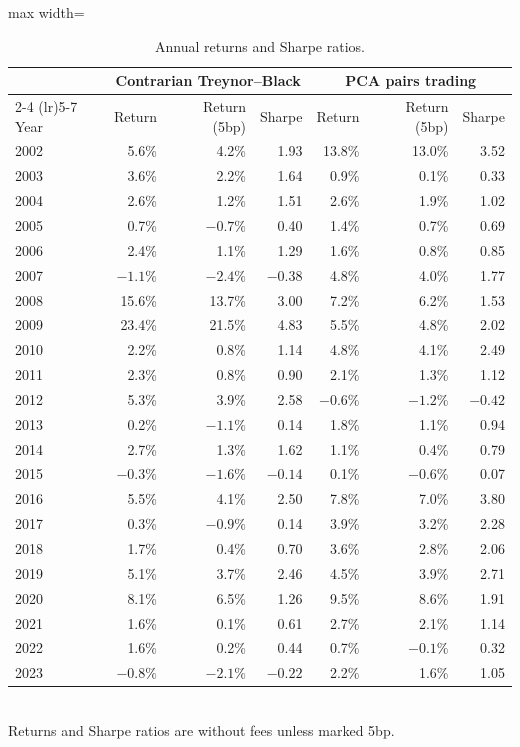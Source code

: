 \documentclass[11pt,letterpaper]{article}
\begin{document}
\begin{table}[!htbp]
\centering
\caption{Annual returns and Sharpe ratios.}
\label{tab:yearly}
\begin{adjustbox}{max width=\linewidth}
\begin{tabular}{lrrrrrr}
\toprule
& \multicolumn{3}{c}{Contrarian Treynor--Black} & \multicolumn{3}{c}{PCA pairs trading} \\
\cmidrule(lr){2-4} \cmidrule(lr){5-7}
Year & Return & Return (5bp) & Sharpe & Return & Return (5bp) & Sharpe \\
\midrule
2002 & 5.6\% & 4.2\% & 1.93 & 13.8\% & 13.0\% & 3.52 \\
2003 & 3.6\% & 2.2\% & 1.64 & 0.9\% & 0.1\% & 0.33 \\
2004 & 2.6\% & 1.2\% & 1.51 & 2.6\% & 1.9\% & 1.02 \\
2005 & 0.7\% & $-0.7\%$ & 0.40 & 1.4\% & 0.7\% & 0.69 \\
2006 & 2.4\% & 1.1\% & 1.29 & 1.6\% & 0.8\% & 0.85 \\
2007 & $-1.1\%$ & $-2.4\%$ & $-0.38$ & 4.8\% & 4.0\% & 1.77 \\
2008 & 15.6\% & 13.7\% & 3.00 & 7.2\% & 6.2\% & 1.53 \\
2009 & 23.4\% & 21.5\% & 4.83 & 5.5\% & 4.8\% & 2.02 \\
2010 & 2.2\% & 0.8\% & 1.14 & 4.8\% & 4.1\% & 2.49 \\
2011 & 2.3\% & 0.8\% & 0.90 & 2.1\% & 1.3\% & 1.12 \\
2012 & 5.3\% & 3.9\% & 2.58 & $-0.6\%$ & $-1.2\%$ & $-0.42$ \\
2013 & 0.2\% & $-1.1\%$ & 0.14 & 1.8\% & 1.1\% & 0.94 \\
2014 & 2.7\% & 1.3\% & 1.62 & 1.1\% & 0.4\% & 0.79 \\
2015 & $-0.3\%$ & $-1.6\%$ & $-0.14$ & 0.1\% & $-0.6\%$ & 0.07 \\
2016 & 5.5\% & 4.1\% & 2.50 & 7.8\% & 7.0\% & 3.80 \\
2017 & 0.3\% & $-0.9\%$ & 0.14 & 3.9\% & 3.2\% & 2.28 \\
2018 & 1.7\% & 0.4\% & 0.70 & 3.6\% & 2.8\% & 2.06 \\
2019 & 5.1\% & 3.7\% & 2.46 & 4.5\% & 3.9\% & 2.71 \\
2020 & 8.1\% & 6.5\% & 1.26 & 9.5\% & 8.6\% & 1.91 \\
2021 & 1.6\% & 0.1\% & 0.61 & 2.7\% & 2.1\% & 1.14 \\
2022 & 1.6\% & 0.2\% & 0.44 & 0.7\% & $-0.1\%$ & 0.32 \\
2023 & $-0.8\%$ & $-2.1\%$ & $-0.22$ & 2.2\% & 1.6\% & 1.05 \\
\bottomrule
\end{tabular}
\end{adjustbox}
\\[4pt]
\small Returns and Sharpe ratios are without fees unless marked 5bp.
\end{table}
\end{document}
